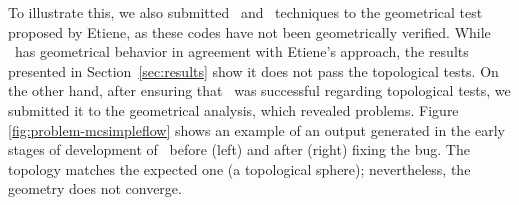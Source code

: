 To illustrate this, we also submitted \mclewiner\ and \mcsimpleflow\ techniques 
to the geometrical test proposed by Etiene, as these codes have not been 
geometrically verified. While \mclewiner\ has geometrical
behavior in agreement with Etiene's approach, the results presented in Section~\ref{sec:results} 
show it does not pass the topological tests. 
On the other hand, after ensuring that 
\mcsimpleflow\ was successful regarding topological tests, 
we submitted it to the geometrical analysis, which revealed problems.
Figure \ref{fig:problem-mcsimpleflow} shows an
example of an output generated in the early stages of development of \mcsimpleflow\ before (left) and after
(right) fixing the bug. The topology matches the expected one (a
topological sphere); nevertheless, the geometry does not converge. 



